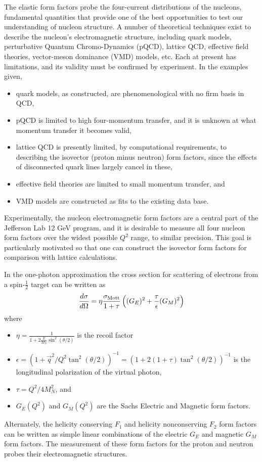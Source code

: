 \documentclass[12pt,letterpaper,oneside]{article}
\begin{document}
The elastic form factors probe the four-current distributions of the
nucleons, fundamental quantities that provide
one of the best opportunities to test our understanding of 
nucleon structure.
A number of theoretical techniques exist to describe the
nucleon's electromagnetic structure,
including quark models, perturbative Quantum Chromo-Dynamics (pQCD), lattice QCD,
effective field theories, vector-meson dominance (VMD) models, etc.
Each at present has limitations, and its validity must be confirmed by experiment.
In the examples given,
\begin{itemize}
\item  quark models, as constructed, are phenomenological with no firm basis in QCD,
\item  pQCD is limited to high four-momentum transfer, and it is unknown at what
momentum transfer it becomes valid,
\item  lattice QCD is presently limited, by computational requirements, to describing the isovector 
(proton minus neutron) form factors, since the effects of disconnected quark lines
largely cancel in these,
\item  effective field theories are limited to small momentum transfer, and
\item  VMD models are constructed as fits to the existing data base.
\end{itemize}

Experimentally, the nucleon electromagnetic form factors are a central
part of the Jefferson Lab 12 GeV program, and it is desirable to measure
all four nucleon form factors over the widest possible $Q^2$ range, to similar 
precision.
This goal is particularly motivated so that one can construct the isovector form factors
for comparison with lattice calculations.


In the one-photon approximation the cross section for scattering of
electrons from
a spin-$\frac{1}{2}$ target can be written as
$$\frac{d\sigma}{d\Omega}=\eta \frac{\sigma_{\mbox{\scriptsize
    Mott}}}{1+\tau}\left((G_E)^2+\frac{\tau}{\epsilon}(G_M)^2
  \right)$$
where
\begin{itemize}
\item $\eta=\frac{1}{1+2\frac{E}{M_N}\sin^2(\theta/2)}$ is the recoil
factor
\item $\epsilon=(1+\vec{q}^2/Q^2\tan^2(\theta/2))^{-1}=
(1+2(1+\tau)\tan^2(\theta/2))^{-1}$
    is the longitudinal polarization of the virtual photon,
\item $\tau=Q^2/4 M_N^2$, and
\item $G_E(Q^2)$ and $G_M(Q^2)$ are the Sachs Electric and Magnetic form factors.
\end{itemize}
Alternately, the helicity conserving 
$F_1$ and helicity nonconserving $F_2$ form
factors can be written as simple linear combinations of the
 electric $G_E$ and magnetic $G_M$ form factors.
The measurement of these form factors for the proton and neutron
    probes their electromagnetic structures.
\end{document}
